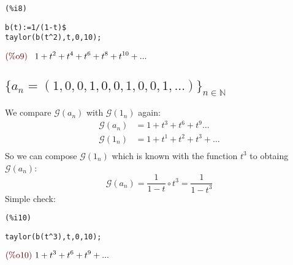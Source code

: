 \noindent
\begin{minipage}[t]{8ex}{\color{red}\bf
\begin{verbatim}
(%i8) 
\end{verbatim}}
\end{minipage}
\begin{minipage}[t]{\textwidth}{\color{blue}
\begin{verbatim}
b(t):=1/(1-t)$
taylor(b(t^2),t,0,10);
\end{verbatim}}
\end{minipage}
\begin{math}\displaystyle
\parbox{8ex}{\color{labelcolor}(\%o9) }
1+{t}^{2}+{t}^{4}+{t}^{6}+{t}^{8}+{t}^{10}+...
\end{math}

\subsection{$\{a_n = (1,0,0,1,0,0,1,0,0,1,\ldots)\}_{n\in \mathbb{N} }$}

We compare $\mathcal{G}(a_n) $ with $\mathcal{G} (1_n)$ again:
\begin{displaymath}
  \begin{split}
    \mathcal{G} (a_n) &= 1 + t^3 + t^6 + t^9\ldots \\
    \mathcal{G} (1_n) &= 1 + t^1 + t^2 + t^3 + \ldots \\
  \end{split}
\end{displaymath}
So we can compose $\mathcal{G} (1_n)$ which is known with the function
$t^3$ to obtaing $\mathcal{G} (a_n)$:
\begin{displaymath}
  \mathcal{G} (a_n) =  \frac{1}{1-t} \circ t^3 =  \frac{1}{1-t^3} 
\end{displaymath}
Simple check:

\noindent
\begin{minipage}[t]{8ex}{\color{red}\bf
\begin{verbatim}
(%i10) 
\end{verbatim}}
\end{minipage}
\begin{minipage}[t]{\textwidth}{\color{blue}
\begin{verbatim}
taylor(b(t^3),t,0,10);
\end{verbatim}}
\end{minipage}
\begin{math}\displaystyle
\parbox{8ex}{\color{labelcolor}(\%o10) }
1+{t}^{3}+{t}^{6}+{t}^{9}+...
\end{math}

